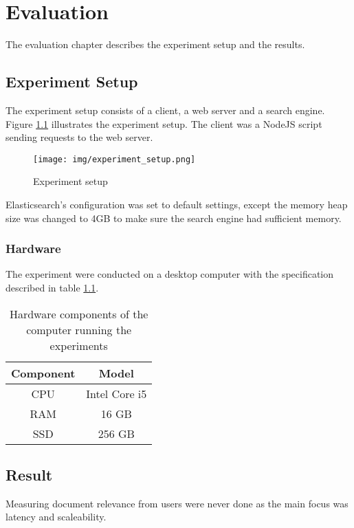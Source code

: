 \chapter{Evaluation}
\label{ch:evaluation}
The evaluation chapter describes the experiment setup and the results.

\section{Experiment Setup}

The experiment setup consists of a client, a web server and a search engine.
Figure \ref{fig:experiment-setup} illustrates the experiment setup.
The client was a NodeJS script sending requests to the web server.

\begin{figure}[h!]
  \centering \texttt{[image: img/experiment\_setup.png]}
  \caption{Experiment setup}
  \label{fig:experiment-setup}
\end{figure}

Elasticsearch's configuration was set to default settings,
except the memory heap size was changed to 4GB to make sure the search engine had sufficient memory.

\subsection{Hardware}
The experiment were conducted on a desktop computer with the specification described in table \ref{tbl:hardware}.

\begin{table}[h]
    \centering
    \begin{tabular}{c|c}
      \textbf{Component} & \textbf{Model} \\ \hline
      CPU       & Intel Core i5           \\ \hline
      RAM       & 16 GB                   \\ \hline
      SSD       & 256 GB                  \\ \hline
    \end{tabular}
    \caption{Hardware components of the computer running the experiments}
    \label{tbl:hardware}
\end{table}

\section{Result}
Measuring document relevance from users were never done as the main focus was latency and scaleability.

